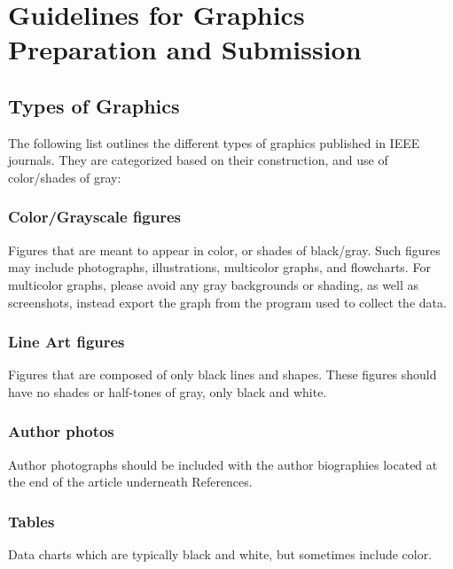 \documentclass{ieeeaccess}
\begin{document}
\section{Guidelines for Graphics Preparation and Submission}
\label{sec:guidelines}

\subsection{Types of Graphics}
The following list outlines the different types of graphics published in
IEEE journals. They are categorized based on their construction, and use of
color/shades of gray:

\subsubsection{Color/Grayscale figures}
{Figures that are meant to appear in color, or shades of black/gray. Such
    figures may include photographs, illustrations, multicolor graphs, and
    flowcharts. For multicolor graphs, please avoid any gray backgrounds or shading, as well as screenshots, instead export the graph from the program used to collect the data.}

\subsubsection{Line Art figures}
{Figures that are composed of only black lines and shapes. These figures
    should have no shades or half-tones of gray, only black and white.}

\subsubsection{Author photos}
{Author photographs should be included with the author biographies located at the end of the article underneath References. }

\subsubsection{Tables}
{Data charts which are typically black and white, but sometimes include
    color.}
\end{document}
